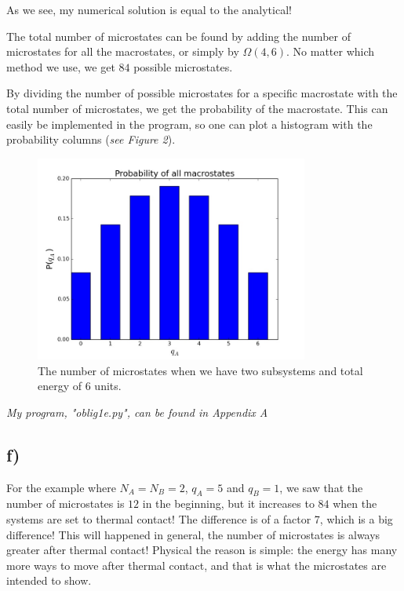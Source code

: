 \documentclass{scrartcl}
\begin{document}
\par\vspace{3mm}As we see, my numerical solution is equal to the analytical!\par \vspace{3mm}
The total number of microstates can be found by adding the number of microstates for all the macrostates, or simply by $\Omega(4,6)$. No matter which method we use, we get $84$ possible microstates.\par \vspace{3mm}
By dividing the number of possible microstates for a specific macrostate with the total number of microstates, we get the probability of the macrostate. This can easily be implemented in the program, so one can plot a histogram with the probability columns (\textit{see Figure 2}).
\begin{figure}[!htbp]
\centering
\includegraphics[width=90mm]{oblig1e2.jpg}
\caption{The number of microstates when we have two subsystems and total energy of 6 units. \label{overflow}}
\end{figure}
\par\vspace{3mm}\textit{My program, "oblig1e.py", can be found in Appendix A}

\subsection*{f)}
For the example where $N_A=N_B=2$, $q_A=5$ and $q_B=1$, we saw that the number of microstates is $12$ in the beginning, but it increases to $84$ when the systems are set to thermal contact! The difference is of a factor 7, which is a big difference! This will happened in general, the number of microstates is always greater after thermal contact! Physical the reason is simple: the energy has many more ways to move after thermal contact, and that is what the microstates are intended to show. 
\newpage
\end{document}
